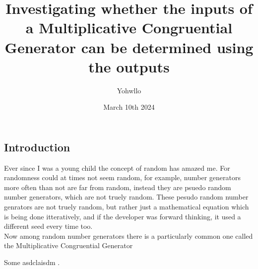 \documentclass[12pft, english]{article}
\title{Investigating whether the inputs of a Multiplicative Congruential Generator can be determined using the outputs}
\author{Yohwllo}
\date{March 10th 2024}
\begin{document}
\maketitle

\tableofcontents
\pagebreak

\begin{multicols}{2}
  \section{Introduction}
  Ever since I was a young child the concept of random has amazed me. For randomness could at times not seem random, for example, number generators more often than not are far from random, instead they are psuedo random number generators, which are not truely random. These pesudo random number genrators are not truely random, but rather just a mathematical equation which is being done itteratively, and if the developer was forward thinking, it used a different seed every time too. \\
  Now among random number generators there is a particularly common one called the Multiplicative Congruential Generator

\end{multicols}

Some asdclaisdm \cite{hull1962random}.



\end{document}
